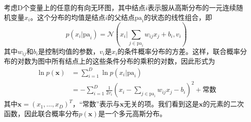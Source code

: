 考虑D个变量上的任意的有向无环图，其中结点$i$表示服从高斯分布的一元连续随机变量$x_i$。这个分布的均值是结点$i$的父结点$\textrm{pa}_i$的状态的线性组合，即
\begin{equation}
	p(x_i|\textrm{pa}_i)=\mathcal{N}\left(x_i\Bigg|\sum_{j\in \textrm{pa}_i}w_{ij}x_j+b_i,v_i \right)
\end{equation}
其中$w_{ij}$和$b_i$是控制均值的参数，$v_i$是$x_i$的条件概率分布的方差。这样，联合概率分布的对数为图中所有结点上的这些条件分布的乘积的对数，因此形式为
\begin{equation}
	\begin{aligned}
	\ln p(\boldsymbol{x})&=\sum_{i=1}^{D}\ln p(x_i|\textrm{pa}_i)\\
	&=-\sum_{i=1}^{D}\frac{1}{2v_i}\left(x_i-\sum_{j\in \textrm{pa}_i}w_{ij}x_j-b_i \right)^2+\text{常数}
	\end{aligned}
\end{equation}
其中$\boldsymbol{x}=(x_1,\dots,x_D)^T$，“常数”表示与$\boldsymbol{x}$无关的项。我们看到这是$\boldsymbol{x}$的元素的二次函数，因此联合概率分布$p(\boldsymbol{x})$是一个多元高斯分布。

